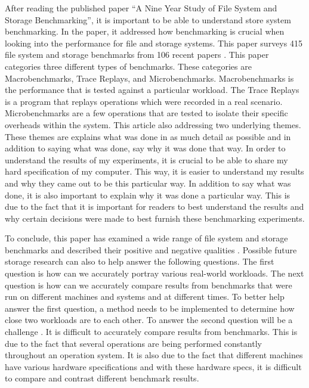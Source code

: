 \documentclass{article}
\begin{document}
After reading the published paper ``A Nine Year Study of File System and Storage Benchmarking'', it is important to be able to understand store system benchmarking. In the paper, it addressed how benchmarking is crucial when looking into the performance for file and storage systems. This paper surveys 415 file system and storage benchmarks from 106 recent papers \cite{Traeger:2008:NYS:1367829.1367831}. This paper categories three different types of benchmarks. These categories are Macrobenchmarks, Trace Replays, and Microbenchmarks. Macrobenchmarks is the performance that is tested against a particular workload. The Trace Replays is a program that replays operations which were recorded in a real scenario. Microbenchmarks are a few operations that are tested to isolate their specific overheads within the system. This article also addressing two underlying themes. These themes are explains what was done in as much detail as possible and in addition to saying what was done, say why it was done that way. In order to understand the results of my experiments, it is crucial to be able to share my hard specification of my computer. This way, it is easier to understand my results and why they came out to be this particular way. In addition to say what was done, it is also important to explain why it was done a particular way. This is due to the fact that it is important for readers to best understand the results and why certain decisions were made to best furnish these benchmarking experiments.
\par
To conclude, this paper has examined a wide range of file system and storage benchmarks and described their positive and negative qualities \cite{Traeger:2008:NYS:1367829.1367831}. Possible future storage research can also to help answer the following questions. The first question is how can we accurately portray various real-world workloads. The next question is how can we accurately compare results from benchmarks that were run on different machines and systems and at different times. To better help answer the first question, a method needs to be implemented to determine how close two workloads are to each other. To answer the second question will be a challenge \cite{Traeger:2008:NYS:1367829.1367831}. It is difficult to accurately compare results from benchmarks. This is due to the fact that several operations are being performed constantly throughout an operation system. It is also due to the fact that different machines have various hardware specifications and with these hardware specs, it is difficult to compare and contrast different benchmark results. 
\end{document}
